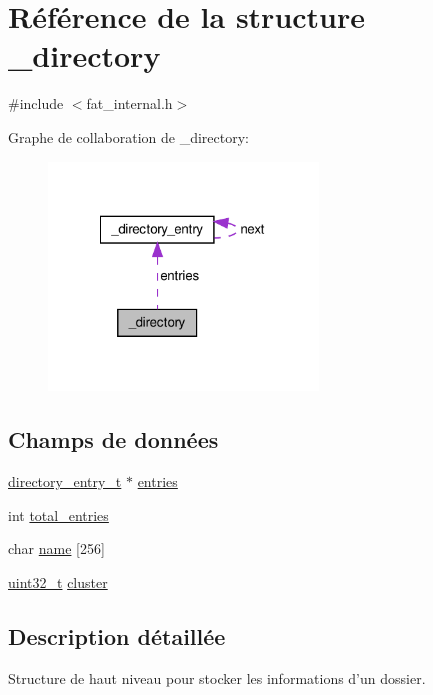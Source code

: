 \hypertarget{struct__directory}{\section{Référence de la structure \-\_\-directory}
\label{struct__directory}
}


{\ttfamily \#include $<$fat\-\_\-internal.\-h$>$}



Graphe de collaboration de \-\_\-directory\-:\nopagebreak
\begin{figure}[H]
\begin{center}
\leavevmode
\includegraphics[width=203pt]{struct__directory__coll__graph}
\end{center}
\end{figure}
\subsection*{Champs de données}
\begin{DoxyCompactItemize}
\item 
\hyperlink{fat__internal_8h_ab6546cb0abf935a615fae20884a41818}{directory\-\_\-entry\-\_\-t} $\ast$ \hyperlink{struct__directory_a2aa96162372442698a14e116ce88110d}{entries}
\item 
int \hyperlink{struct__directory_aeb73476149e19828774d4dfbd96a051f}{total\-\_\-entries}
\item 
char \hyperlink{struct__directory_a535c678fe29215d35ac64200865147a4}{name} \mbox{[}256\mbox{]}
\item 
\hyperlink{kernel_2include_2types_8h_a33594304e786b158f3fb30289278f5af}{uint32\-\_\-t} \hyperlink{struct__directory_a5a45241095c7fb2a39f158638631ddbc}{cluster}
\end{DoxyCompactItemize}


\subsection{Description détaillée}
Structure de haut niveau pour stocker les informations d'un dossier. 

